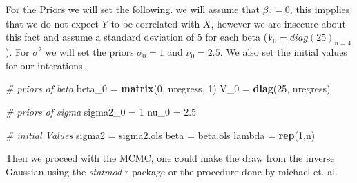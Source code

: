 \documentclass[
]{article}
\newenvironment{Shaded}{\begin{snugshade}}{\end{snugshade}}
\newcommand{\CommentTok}[1]{\textcolor[rgb]{0.56,0.35,0.01}{\textit{#1}}}
\newcommand{\DecValTok}[1]{\textcolor[rgb]{0.00,0.00,0.81}{#1}}
\newcommand{\FloatTok}[1]{\textcolor[rgb]{0.00,0.00,0.81}{#1}}
\newcommand{\KeywordTok}[1]{\textcolor[rgb]{0.13,0.29,0.53}{\textbf{#1}}}
\newcommand{\NormalTok}[1]{#1}
\newcommand{\StringTok}[1]{\textcolor[rgb]{0.31,0.60,0.02}{#1}}
\begin{document}
For the Priors we will set the following. we will assume that
\(\beta_0 = 0\), this impplies that we do not expect \(Y\) to be
correlated with \(X\), however we are insecure about this fact and
assume a standard deviation of 5 for each beta
(\(V_0 = diag(25)_{n=4}\)). For \(\sigma^2\) we will set the priors
\(\sigma_0 = 1\) and \(\nu_0 = 2.5\). We also set the initial values for
our interations.

\begin{Shaded}
\begin{Highlighting}[]
\CommentTok{# priors of beta}
\NormalTok{beta_}\DecValTok{0}\NormalTok{ =}\StringTok{ }\KeywordTok{matrix}\NormalTok{(}\DecValTok{0}\NormalTok{, nregress, }\DecValTok{1}\NormalTok{)}
\NormalTok{V_}\DecValTok{0}\NormalTok{ =}\StringTok{ }\KeywordTok{diag}\NormalTok{(}\DecValTok{25}\NormalTok{, nregress)}

\CommentTok{# priors of sigma}
\NormalTok{sigma2_}\DecValTok{0}\NormalTok{ =}\StringTok{ }\DecValTok{1}
\NormalTok{nu_}\DecValTok{0}\NormalTok{ =}\StringTok{ }\FloatTok{2.5}

\CommentTok{# initial Values}
\NormalTok{sigma2 =}\StringTok{ }\NormalTok{sigma2.ols}
\NormalTok{beta =}\StringTok{ }\NormalTok{beta.ols}
\NormalTok{lambda =}\StringTok{ }\KeywordTok{rep}\NormalTok{(}\DecValTok{1}\NormalTok{,n)}
\end{Highlighting}
\end{Shaded}

Then we proceed with the MCMC, one could make the draw from the inverse
Gaussian using the \emph{statmod} r package or the procedure done by
michael et. al.
\end{document}
